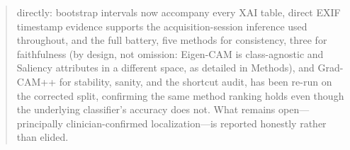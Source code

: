 \begin{abstract}
directly: bootstrap intervals now accompany every XAI table, direct EXIF timestamp evidence supports the acquisition-session inference used throughout, and the full battery, five methods for consistency, three for faithfulness (by design, not omission: Eigen-CAM is class-agnostic and Saliency attributes in a different space, as detailed in Methods), and Grad-CAM++ for stability, sanity, and the shortcut audit, has been re-run on the corrected split, confirming the same method ranking holds even though the underlying classifier's accuracy does not. What remains open---principally clinician-confirmed localization---is reported honestly rather than elided.
\end{abstract}
